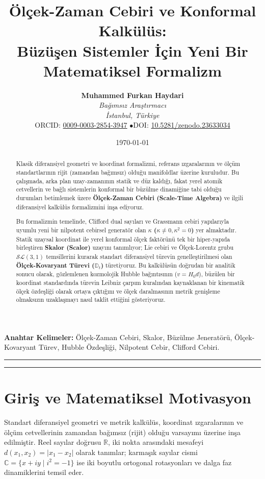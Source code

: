 \documentclass[11pt,a4paper]{article}
\title{\textbf{Ölçek-Zaman Cebiri ve Konformal Kalkülüs: \\ Büzüşen Sistemler İçin Yeni Bir Matematiksel Formalizm}}
\author{
    \textbf{Muhammed Furkan Haydari} \\
    \textit{Bağımsız Araştırmacı} \\
    \textit{İstanbul, Türkiye} \\
    \small ORCID: \href{https://orcid.org/0009-0003-2854-3947}{0009-0003-2854-3947} \quad$\bullet$\quad \small DOI: \href{https://doi.org/10.5281/zenodo.23633034}{10.5281/zenodo.23633034}
}
\date{\today}
\begin{document}
\maketitle

\begin{abstract}
    Klasik diferansiyel geometri ve koordinat formalizmi, referans ızgaralarının ve ölçüm standartlarının rijit (zamandan bağımsız) olduğu manifoldlar üzerine kuruludur. Bu çalışmada, arka plan uzay-zamanının statik ve düz kaldığı, fakat yerel atomik cetvellerin ve bağlı sistemlerin konformal bir büzülme dinamiğine tabi olduğu durumları betimlemek üzere \textbf{Ölçek-Zaman Cebiri (Scale-Time Algebra)} ve ilgili diferansiyel kalkülüs formalizmini inşa ediyoruz.

    Bu formalizmin temelinde, Clifford dual sayıları ve Grassmann cebiri yapılarıyla uyumlu yeni bir nilpotent cebirsel generatör olan \textbf{$\kappa$ ($\kappa \neq 0, \kappa^2 = 0$)} yer almaktadır. Statik uzaysal koordinat ile yerel konformal ölçek faktörünü tek bir hiper-yapıda birleştiren \textbf{Skalor (Scalor)} uzayını tanımlıyor; Lie cebiri ve Ölçek-Lorentz grubu $\mathcal{SL}(3,1)$ temsillerini kurarak standart diferansiyel türevin genelleştirilmesi olan \textbf{Ölçek-Kovaryant Türevi ($\mathbb{D}_t$)} türetiyoruz. Bu kalkülüsün doğrudan bir analitik sonucu olarak, gözlemlenen kozmolojik Hubble bağıntısının ($v = H_0 d$), büzülen bir koordinat standardında türevin Leibniz çarpım kuralından kaynaklanan bir kinematik ölçek özdeşliği olarak ortaya çıktığını ve ölçek daralmasının metrik genişleme olmaksızın uzaklaşmayı nasıl taklit ettiğini gösteriyoruz.
\end{abstract}

\vspace{1em}
\noindent\textbf{Anahtar Kelimeler:} Ölçek-Zaman Cebiri, Skalor, Büzülme Jeneratörü, Ölçek-Kovaryant Türev, Hubble Özdeşliği, Nilpotent Cebir, Clifford Cebiri.

\vspace{1em}
\hrule
\vspace{0.8em}
\tableofcontents
\vspace{0.8em}
\hrule
\vspace{1.5em}

\section{Giriş ve Matematiksel Motivasyon}
\label{sec:giris}

Standart diferansiyel geometri ve metrik kalkülüs, koordinat ızgaralarının ve ölçüm cetvellerinin zamandan bağımsız (rijit) olduğu varsayımı üzerine inşa edilmiştir. Reel sayılar doğrusu $\mathbb{R}$, iki nokta arasındaki mesafeyi $d(x_1, x_2) = |x_1 - x_2|$ olarak tanımlar; karmaşık sayılar cismi $\mathbb{C} = \{x + i y \mid i^2 = -1\}$ ise iki boyutlu ortogonal rotasyonları ve dalga faz dinamiklerini temsil eder.
\end{document}
